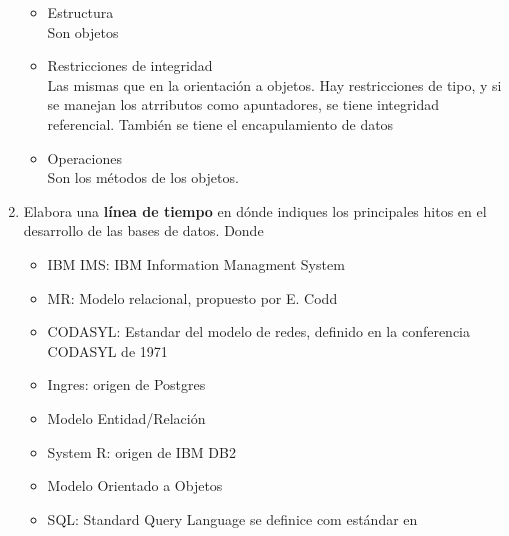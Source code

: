 \documentclass{article}
\begin{document}
\begin{enumerate}[label=\alph*.]
{\begin{itemize}
{                \begin{itemize}
                    \item {Estructura\\
                    Son objetos}
                    \item {Restricciones de integridad \\
                    Las mismas que en la orientación a objetos. Hay 
                    restricciones de tipo, y si se manejan los atrributos 
                    como apuntadores, se tiene integridad referencial.
                    También se tiene el encapulamiento de datos}
                    \item{Operaciones \\
                    Son los métodos de los objetos.
                    }
                \end{itemize}
                }
            \end{itemize}
        }
        \item {
            Elabora una \textbf{línea de tiempo} en dónde indiques los principales
            hitos en el desarrollo de las bases de datos.
            \startchronology[startyear=1959, stopyear=1980]
            \stopchronology
            }
            \startchronology[startyear=1981, stopyear=2000]
            \stopchronology
            Donde 
            \begin{itemize}
                \item {IBM IMS: IBM Information Managment System}
                \item {MR: Modelo relacional, propuesto por E. Codd}
                \item {CODASYL: Estandar del modelo de redes, definido en la 
                conferencia CODASYL de 1971}
                \item {Ingres: origen de Postgres}
                \item {Modelo Entidad/Relación}
                \item {System R: origen de IBM DB2}
                \item {Modelo Orientado a Objetos}
                \item {SQL: Standard Query Language se definice com estándar en 
}
\end{itemize}
\end{enumerate}
\end{document}
